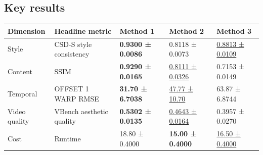 \documentclass[10pt]{article}
\begin{document}
\subsection*{Key results}
\begin{tabular}{@{}lllll@{}}
\toprule
Dimension & Headline metric & Method 1 & Method 2 & Method 3 \\
\midrule
Style & CSD-S style consistency & \textbf{0.9300 ± 0.0086} & 0.8118 ± 0.0073 & \underline{0.8813 ± 0.0109} \\
Content & SSIM & \textbf{0.9290 ± 0.0165} & \underline{0.8111 ± 0.0326} & 0.7153 ± 0.0149 \\
Temporal & OFFSET 1 WARP RMSE & \textbf{31.70 ± 6.7038} & \underline{47.77 ± 10.70} & 63.87 ± 6.8744 \\
Video quality & VBench aesthetic quality & \textbf{0.5302 ± 0.0135} & \underline{0.4643 ± 0.0164} & 0.3957 ± 0.0270 \\
Cost & Runtime & 18.80 ± 0.4000 & \textbf{15.00 ± 0.4000} & \underline{16.50 ± 0.4000} \\
\bottomrule
\end{tabular}
\end{document}
